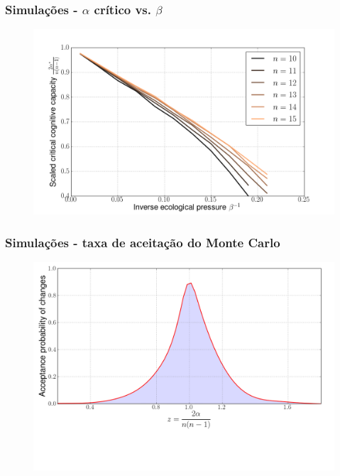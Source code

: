 \documentclass[ignorenonframetext,]{beamer}
\makeatletter
\def\ScaleIfNeededV{%
  \ifdim\Gin@nat@width>0.9\linewidth
    0.9\linewidth
  \else
    \Gin@nat@width
  \fi
}
\def\ScaleIfNeededH{%
  \ifdim\Gin@nat@height>0.9\textheight
    0.9\textheight
  \else
    \Gin@nat@height
  \fi
}
\let\Oldincludegraphics\includegraphics
\renewcommand{\includegraphics}[2][]{\Oldincludegraphics[width=\ScaleIfNeededV,height=\ScaleIfNeededH,keepaspectratio]{#2}}
\makeatother
\begin{document}
\begin{frame}\frametitle{Simulações - $\alpha$ crítico vs. $\beta$}

\begin{figure}[htbp]
\centering
\includegraphics{./figs/critical.png}
\end{figure}

\end{frame}

\begin{frame}\frametitle{Simulações - taxa de aceitação do Monte Carlo}

\begin{figure}[htbp]
\centering
\includegraphics{./figs/acceptrate.png}
\end{figure}

\end{frame}
\end{document}
